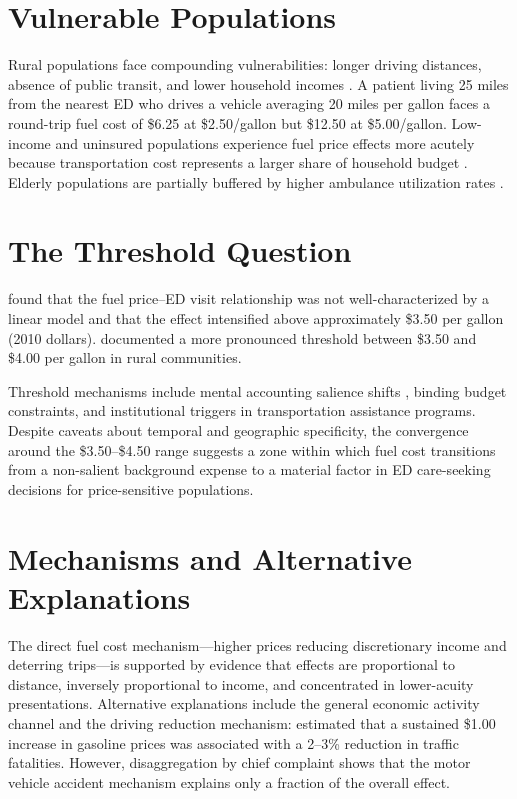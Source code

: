 \documentclass[12pt, a4paper]{article}
\begin{document}
\section{Vulnerable Populations}

Rural populations face compounding vulnerabilities: longer driving distances, absence of public transit, and lower household incomes \citep{hsia2012, guttmann2017}. A patient living 25 miles from the nearest ED who drives a vehicle averaging 20 miles per gallon faces a round-trip fuel cost of \$6.25 at \$2.50/gallon but \$12.50 at \$5.00/gallon. Low-income and uninsured populations experience fuel price effects more acutely because transportation cost represents a larger share of household budget \citep{skinner2016}. Elderly populations are partially buffered by higher ambulance utilization rates \citep{cdcnchs2020}.

\section{The Threshold Question}

\citet{wolfe2012} found that the fuel price--ED visit relationship was not well-characterized by a linear model and that the effect intensified above approximately \$3.50 per gallon (2010 dollars). \citet{skinner2016} documented a more pronounced threshold between \$3.50 and \$4.00 per gallon in rural communities.

Threshold mechanisms include mental accounting salience shifts \citep{thaler1999, kahneman1979}, binding budget constraints, and institutional triggers in transportation assistance programs. Despite caveats about temporal and geographic specificity, the convergence around the \$3.50--\$4.50 range suggests a zone within which fuel cost transitions from a non-salient background expense to a material factor in ED care-seeking decisions for price-sensitive populations.

\section{Mechanisms and Alternative Explanations}

The direct fuel cost mechanism---higher prices reducing discretionary income and deterring trips---is supported by evidence that effects are proportional to distance, inversely proportional to income, and concentrated in lower-acuity presentations. Alternative explanations include the general economic activity channel \citep{ruhm2000} and the driving reduction mechanism: \citet{grabowski2004} estimated that a sustained \$1.00 increase in gasoline prices was associated with a 2--3\% reduction in traffic fatalities. However, disaggregation by chief complaint shows that the motor vehicle accident mechanism explains only a fraction of the overall effect.
\end{document}
